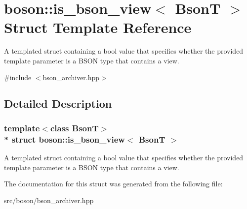 \hypertarget{structboson_1_1is__bson__view}{}\section{boson\+:\+:is\+\_\+bson\+\_\+view$<$ BsonT $>$ Struct Template Reference}
\label{structboson_1_1is__bson__view}


A templated struct containing a bool value that specifies whether the provided template parameter is a B\+S\+ON type that contains a view.  




{\ttfamily \#include $<$bson\+\_\+archiver.\+hpp$>$}



\subsection{Detailed Description}
\subsubsection*{template$<$class BsonT$>$\\*
struct boson\+::is\+\_\+bson\+\_\+view$<$ Bson\+T $>$}

A templated struct containing a bool value that specifies whether the provided template parameter is a B\+S\+ON type that contains a view. 

The documentation for this struct was generated from the following file\+:\begin{DoxyCompactItemize}
\item 
src/boson/bson\+\_\+archiver.\+hpp\end{DoxyCompactItemize}
